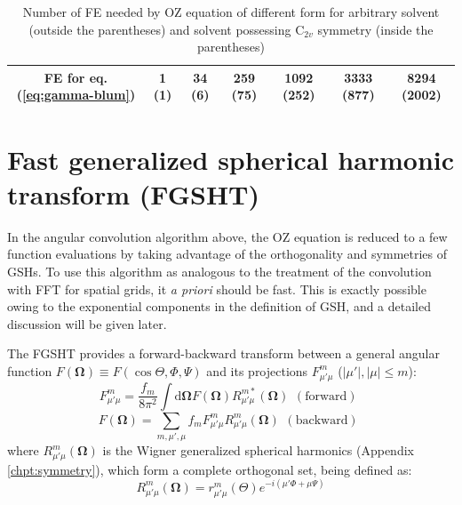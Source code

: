 \begin{table}[h]
\begin{minipage}[t]{1.1\columnwidth}
\begin{center}
\begin{tabular*}{1\textwidth}{@{\extracolsep{\fill}}ccccccc}
{\footnotesize{}FE for eq. (\ref{eq:gamma-blum})} & {\footnotesize{}1 (1)} & {\footnotesize{}34 (6)} & {\footnotesize{}259 (75)} & {\footnotesize{}1092 (252)} & {\footnotesize{}3333 (877)} & {\footnotesize{}8294 (2002)}\tabularnewline
\bottomrule
\end{tabular*}\caption[Number of FE needed by OZ equation of different form]{Number of \acs{FE} needed by \acs{OZ} equation of different form
for arbitrary solvent (outside the parentheses) and solvent possessing
$\mathrm{C}_{2v}$ symmetry (inside the parentheses)\label{tab:FE-of-OZ}}
\par\end{center}%
\end{minipage}
\end{table}


\section{Fast generalized spherical harmonic transform (FGSHT)\label{sec:fgsht}}

In the angular convolution algorithm above, the \acs{OZ} equation
is reduced to a few function evaluations by taking advantage of the
orthogonality and symmetries of \acs{GSH}s. To use this algorithm
as analogous to the treatment of the convolution with \acs{FFT}
for spatial grids, it \textit{a priori }should be fast. This is exactly
possible owing to the exponential components in the definition of
\acs{GSH}, and a detailed discussion will be given later.

The \acs{FGSHT} provides a forward-backward transform between a general
angular function $F(\mathbf{\Omega})\equiv F(\cos\Theta,\Phi,\Psi)$
and its projections $F_{\mu'\mu}^{m}$ ($\left|\mu'\right|,\left|\mu\right|\leq m$):
\begin{equation}
F_{\mu'\mu}^{m}=\frac{f_{m}}{8\pi^{2}}\int\mathrm{d}\mathbf{\Omega}F(\mathbf{\Omega})R_{\mu'\mu}^{m*}(\mathbf{\Omega})\begin{array}{c}
\mathrm{(forward)}\end{array}\label{eq:GSHT_forward}
\end{equation}
\begin{equation}
F(\mathbf{\Omega})=\sum_{m,\mu',\mu}f_{m}F_{\mu'\mu}^{m}R_{\mu'\mu}^{m}(\mathbf{\Omega})\begin{array}{c}
\mathrm{(backward)}\end{array}\label{eq:GSHT_backward}
\end{equation}
where $R_{\mu'\mu}^{m}(\mathbf{\Omega})$ is the Wigner generalized
spherical harmonics (Appendix \ref{chpt:symmetry}), which form a
complete orthogonal set, being defined as:
\begin{equation}
R_{\mu'\mu}^{m}(\mathbf{\Omega})=r_{\mu'\mu}^{m}(\Theta)e^{-i(\mu'\Phi+\mu\Psi)}
\end{equation}


